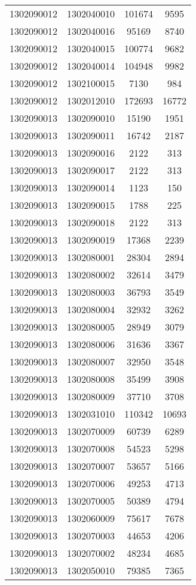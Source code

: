 \begin{longtable}{llcc}
1302090012 & 1302040010 & 101674 & 9595\\
1302090012 & 1302040016 & 95169 & 8740\\
1302090012 & 1302040015 & 100774 & 9682\\
1302090012 & 1302040014 & 104948 & 9982\\
1302090012 & 1302100015 & 7130 & 984\\
1302090012 & 1302012010 & 172693 & 16772\\
1302090013 & 1302090010 & 15190 & 1951\\
1302090013 & 1302090011 & 16742 & 2187\\
1302090013 & 1302090016 & 2122 & 313\\
1302090013 & 1302090017 & 2122 & 313\\
1302090013 & 1302090014 & 1123 & 150\\
1302090013 & 1302090015 & 1788 & 225\\
1302090013 & 1302090018 & 2122 & 313\\
1302090013 & 1302090019 & 17368 & 2239\\
1302090013 & 1302080001 & 28304 & 2894\\
1302090013 & 1302080002 & 32614 & 3479\\
1302090013 & 1302080003 & 36793 & 3549\\
1302090013 & 1302080004 & 32932 & 3262\\
1302090013 & 1302080005 & 28949 & 3079\\
1302090013 & 1302080006 & 31636 & 3367\\
1302090013 & 1302080007 & 32950 & 3548\\
1302090013 & 1302080008 & 35499 & 3908\\
1302090013 & 1302080009 & 37710 & 3708\\
1302090013 & 1302031010 & 110342 & 10693\\
1302090013 & 1302070009 & 60739 & 6289\\
1302090013 & 1302070008 & 54523 & 5298\\
1302090013 & 1302070007 & 53657 & 5166\\
1302090013 & 1302070006 & 49253 & 4713\\
1302090013 & 1302070005 & 50389 & 4794\\
1302090013 & 1302060009 & 75617 & 7678\\
1302090013 & 1302070003 & 44653 & 4206\\
1302090013 & 1302070002 & 48234 & 4685\\
1302090013 & 1302050010 & 79385 & 7365\\

\end{longtable}
